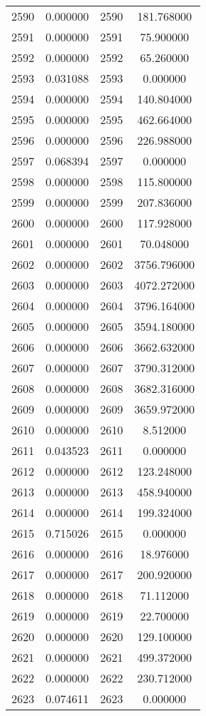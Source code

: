 \documentclass[12pt]{article}
\begin{document}
\begin{longtable}{@{}cccc@{}}
2590 & 0.000000 & 2590 & 181.768000 \\
2591 & 0.000000 & 2591 & 75.900000 \\
2592 & 0.000000 & 2592 & 65.260000 \\
2593 & 0.031088 & 2593 & 0.000000 \\
2594 & 0.000000 & 2594 & 140.804000 \\
2595 & 0.000000 & 2595 & 462.664000 \\
2596 & 0.000000 & 2596 & 226.988000 \\
2597 & 0.068394 & 2597 & 0.000000 \\
2598 & 0.000000 & 2598 & 115.800000 \\
2599 & 0.000000 & 2599 & 207.836000 \\
2600 & 0.000000 & 2600 & 117.928000 \\
2601 & 0.000000 & 2601 & 70.048000 \\
2602 & 0.000000 & 2602 & 3756.796000 \\
2603 & 0.000000 & 2603 & 4072.272000 \\
2604 & 0.000000 & 2604 & 3796.164000 \\
2605 & 0.000000 & 2605 & 3594.180000 \\
2606 & 0.000000 & 2606 & 3662.632000 \\
2607 & 0.000000 & 2607 & 3790.312000 \\
2608 & 0.000000 & 2608 & 3682.316000 \\
2609 & 0.000000 & 2609 & 3659.972000 \\
2610 & 0.000000 & 2610 & 8.512000 \\
2611 & 0.043523 & 2611 & 0.000000 \\
2612 & 0.000000 & 2612 & 123.248000 \\
2613 & 0.000000 & 2613 & 458.940000 \\
2614 & 0.000000 & 2614 & 199.324000 \\
2615 & 0.715026 & 2615 & 0.000000 \\
2616 & 0.000000 & 2616 & 18.976000 \\
2617 & 0.000000 & 2617 & 200.920000 \\
2618 & 0.000000 & 2618 & 71.112000 \\
2619 & 0.000000 & 2619 & 22.700000 \\
2620 & 0.000000 & 2620 & 129.100000 \\
2621 & 0.000000 & 2621 & 499.372000 \\
2622 & 0.000000 & 2622 & 230.712000 \\
2623 & 0.074611 & 2623 & 0.000000 \\

\end{longtable}
\end{document}
